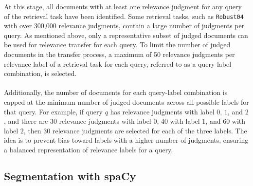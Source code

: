 At this stage, all documents with at least one relevance judgment for any query of the retrieval task have been identified. Some retrieval tasks, such as \texttt{Robust04} with over 300,000 relevance judgments, contain a large number of judgments per query. As mentioned above, only a representative subset of judged documents can be used for relevance transfer for each query. To limit the number of judged documents in the transfer process, a maximum of 50 relevance judgments per relevance label of a retrieval task for each query, referred to as a query-label combination, is selected.
\\\\
Additionally, the number of documents for each query-label combination is capped at the minimum number of judged documents across all possible labels for that query. For example, if query $q$ has relevance judgments with label $0$, $1$, and $2$, and there are 30 relevance judgments with label $0$, 40 with label $1$, and 60 with label $2$, then 30 relevance judgments are selected for each of the three labels. The idea is to prevent bias toward labels with a higher number of judgments, ensuring a balanced representation of relevance labels for a query.

\subsection{Segmentation with spaCy}\label{segmentation-with-spacy}


